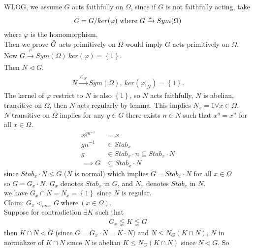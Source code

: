 \documentclass{article}
\begin{document}
\begin{homeworkProblem}
    WLOG, we assume $G$ acts faithfully on $\Omega$, since if $G$ is not faithfully acting, take
    \begin{align}
        \Bar{G} = G / ker (\varphi) \ \text{where} \ G \xrightarrow[]{\varphi} Sym(\Omega)
    \end{align}
    where $\varphi$ is the homomorphism.\\
    Then we prove $\Bar{G}$ acts primitively on $\Omega$ would imply $G$ acts 
    primitively on $\Omega$.\\
    Now $G \xrightarrow[]{\varphi} Sym (\Omega) \ ker (\varphi) = \left\{ 1 \right\}$.\\
    Then $N \lhd G$.
    \begin{align}
        N \xrightarrow[]{\varphi |_{N} } Sym (\Omega), \ ker (\varphi |_{N}) = \left\{ 1 \right\}.
    \end{align}
    The kernel of $\varphi$ restrict to $N$ is also $\left\{ 1 \right\}$, 
    so $N$ acts faithfully,
    $N$ is abelian, transitive on $\Omega$, then 
    $N$ acts regularly by lemma. 
    This implies $N_x = 1 \forall x \in \Omega$.\\
    $N$ transitive on $\Omega$ implies 
    for any $g \in G$ there exists $n \in N$ such that
    $x^g = x^n$ for all $x \in \Omega$.
    \begin{align}
        x^{gn^{-1}} &= x\\
        gn^{-1} &\in Stab_x\\
        g &\in Stab_x \cdot n \subseteq Stab_x \cdot N\\
        \implies G &\subseteq Stab_x \cdot N
    \end{align}
    since $Stab_x \cdot N \leq G$ ($N$ is normal)
    which implies $G = Stab_x \cdot N$ for all $x \in \Omega$\\
    so $G = G_x \cdot N$. $G_x$ denotes $Stab_x$ in $G$, and $N_x$ denotes $Stab_x$ in $N$.\\
    we have $G_x \cap N = N_x = \left\{ 1 \right\}$ since $N$ is regular.\\
    Claim: $G_x <_{max} G \ \text{where} \ (x \in \Omega)$.\\
    Suppose for contradiction $\exists K$ such that 
    \begin{align}
        G_x \lneqq K \lneqq G
    \end{align}
    then $K \cap N \lhd G$ (since $G = G_x \cdot N = K \cdot N$)
    and $N \leq N_G(K \cap N)$, $N$ in normalizer of $K \cap N$ since $N$ is abelian
    $K \leq N_G(K \cap N)$ since $N \lhd G$. So

\end{homeworkProblem}
\end{document}
